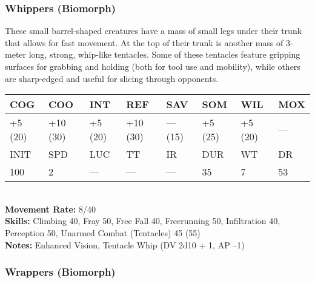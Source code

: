 \subsubsection{Whippers (Biomorph)}

These small barrel-shaped creatures have a mass 
of small legs under their trunk that allows for fast 
movement. At the top of their trunk is another mass 
of 3-meter long, strong, whip-like tentacles. Some 
of these tentacles feature gripping surfaces for grabbing
and holding (both for tool use and mobility),
while others are sharp-edged and useful for slicing 
through opponents. 
\\
\begin{tabular}{|l|l|l|l|l|l|l|l|}
\hline
COG & COO & INT & REF & SAV & SOM & WIL & MOX \\
\hline
+5 (20) &  +10 (30) &  +5 (20) &  +10 (30) &  — (15) &  +5 (25) &  +5 (20) &  — \\
\hline
INIT & SPD & LUC & TT & IR & DUR & WT & DR \\
\hline
100 & 2 & — & — & — & 35 & 7 & 53 \\
\hline
\end{tabular}
\\
\textbf{Movement Rate:} 8/40
\\
\textbf{Skills:} Climbing 40, Fray 50, Free Fall 40, Freerunning 50, Infiltration 40, Perception 50, Unarmed Combat (Tentacles) 45 (55)
\\
\textbf{Notes: }Enhanced Vision, Tentacle Whip (DV 2d10 + 1, AP –1) 

\subsubsection{Wrappers (Biomorph)}

